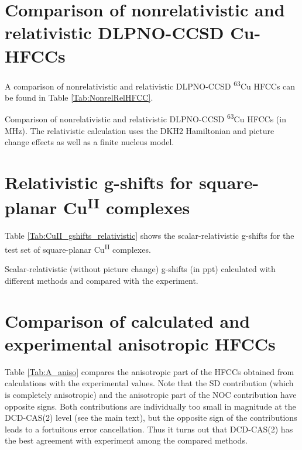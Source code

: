 \section{Comparison of nonrelativistic and relativistic DLPNO-CCSD Cu-HFCCs}
\label{Sec:appendix_nonrelvsrelHFCC}
A comparison of nonrelativistic and relativistic DLPNO-CCSD \textsuperscript{63}Cu HFCCs can be found in Table \ref{Tab:NonrelRelHFCC}.
\begin{table}
\small
\centering
\ttabbox
{\caption[Comparison of nonrelativistic and relativistic DLPNO-CCSD \textsuperscript{63}Cu HFCCs.]{Comparison of nonrelativistic and relativistic DLPNO-CCSD \textsuperscript{63}Cu HFCCs (in MHz). The relativistic calculation uses the DKH2 Hamiltonian and picture change effects as well as a finite nucleus model.}
\label{Tab:NonrelRelHFCC}}
{
}
\end{table} 

\section{Relativistic g-shifts for square-planar Cu\textsuperscript{II} complexes}
\label{Sec:appendix_relgshifts_CuII}
Table \ref{Tab:CuII_gshifts_relativistic} shows the scalar-relativistic g-shifts for the test set of square-planar Cu\textsuperscript{II} complexes.
\begin{table}
\small
\centering
\ttabbox
{\caption[Scalar-relativistic g-shifts compared with the experiment.]{Scalar-relativistic (without picture change) g-shifts (in ppt) calculated with different methods and compared with the experiment.}
\label{Tab:CuII_gshifts_relativistic}}
{
}
\end{table}

\section{Comparison of calculated and experimental anisotropic HFCCs}
\label{Sec:appendix_Aaniso}
Table \ref{Tab:A_aniso} compares the anisotropic part of the HFCCs obtained from calculations with the experimental values. Note that the SD contribution (which is completely anisotropic) and the anisotropic part of the NOC contribution have opposite signs. Both contributions are individually too small in magnitude at the DCD-CAS(2) level (see the main text), but the opposite sign of the contributions leads to a fortuitous error cancellation. Thus it turns out that DCD-CAS(2) has the best agreement with experiment among the compared methods.

